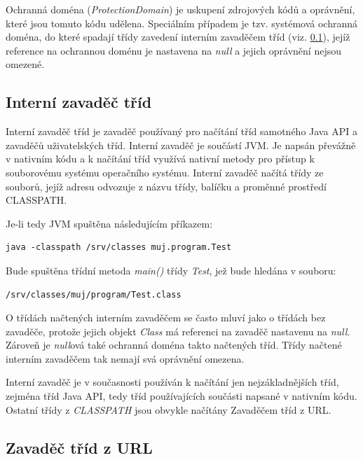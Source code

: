 Ochranná doména ({\it ProtectionDomain}) je uskupení zdrojových kódů a oprávnění, které jsou tomuto kódu udělena.
Speciálním případem je tzv. systémová ochranná doména, do které spadají třídy zavedení interním zavaděčem tříd (viz. \ref{interniZavadec}), jejíž reference na ochrannou doménu je nastavena na {\it null} a jejich oprávnění nejsou omezené. \cite[5.4]{oaks}

\subsection{Interní zavaděč tříd} \label{interniZavadec}

Interní zavaděč tříd je zavaděč používaný pro načítání tříd samotného Java API a zavaděčů uživatelských tříd.
Interní zavaděč je součástí JVM. Je napsán převážně v nativním kódu a k načítání tříd využívá nativní metody pro přístup k souborovému systému operačního systému.
Interní zavaděč načítá třídy ze souborů, jejíž adresu odvozuje z názvu třídy, balíčku a proměnné prostředí CLASSPATH. \cite[3.2.1]{oaks}

Je-li tedy JVM spuštěna následujícím příkazem:

\begin{verbatim}
java -classpath /srv/classes muj.program.Test
\end{verbatim}

Bude spuštěna třídní metoda {\it main()} třídy {\it Test}, jež bude hledána v souboru:

\begin{verbatim}
/srv/classes/muj/program/Test.class
\end{verbatim}

O třídách načtených interním zavaděčem se často mluví jako o třídách bez zavaděče, protože jejich objekt {\it Class} má referenci na zavaděč nastavenu na {\it null}. \cite[3.2.1]{oaks} Zároveň je {\it null}ová také ochranná doména takto načtených tříd. Třídy načtené interním zavaděčem tak nemají svá oprávnění omezena.

Interní zavaděč je v současnosti používán k načítání jen nejzákladnějších tříd, zejména tříd Java API, tedy tříd používajících součásti napsané v nativním kódu. Ostatní třídy z {\it CLASSPATH} jsou obvykle načítány Zavaděčem tříd z URL.

\subsection{Zavaděč tříd z URL}

